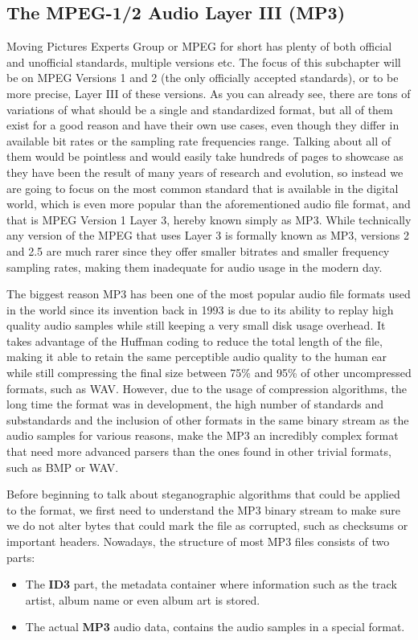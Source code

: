 \begin{multicols*}{2}
\section{The MPEG-1/2 Audio Layer III (MP3)}
Moving Pictures Experts Group or MPEG for short has plenty of both official and unofficial standards, multiple versions etc. The focus of this subchapter will be on MPEG Versions 1 and 2 (the only officially accepted standards), or to be more precise, Layer III of these versions. As you can already see, there are tons of variations of what should  be a single and standardized format, but all of them exist for a good reason and have their own use cases, even though they differ in available bit rates or the sampling rate frequencies range. Talking about all of them would be pointless and would easily take hundreds of pages to showcase as they have been the result of many years of research and evolution, so instead we are going to focus on the most common standard that is available in the digital world, which is even more popular than the aforementioned audio file format, and that is MPEG Version 1 Layer 3, hereby known simply as MP3. While technically any version of the MPEG that uses Layer 3 is formally known as MP3, versions 2 and 2.5 are much rarer since they offer smaller bitrates and smaller frequency sampling rates, making them inadequate for audio usage in the modern day.

The biggest reason MP3 has been one of the most popular audio file formats used in the world since its invention back in 1993 is due to its ability to replay high quality audio samples while still keeping a very small disk usage overhead. It takes advantage of the Huffman coding to reduce the total length of the file, making it able to retain the same perceptible audio quality to the human ear while still compressing the final size between 75\% and 95\% of other uncompressed formats, such as WAV\cite{genesis_of_mp3}. However, due to the usage of compression algorithms, the long time the format was in development, the high number of standards and substandards and the inclusion of other formats in the same binary stream as the audio samples for various reasons, make the MP3 an incredibly complex format that need more advanced parsers than the ones found in other trivial formats, such as BMP or WAV.

Before beginning to talk about steganographic algorithms that could be applied to the format, we first need to understand the MP3 binary stream to make sure we do not alter bytes that could mark the file as corrupted, such as checksums or important headers. Nowadays, the structure of most MP3 files consists of two parts:
\begin{itemize}
	\item The \textbf{ID3} part, the metadata container where information such as the track artist, album name or even album art is stored.
	\item The actual \textbf{MP3} audio data, contains the audio samples in a special format.
\end{itemize}


\end{multicols*}
